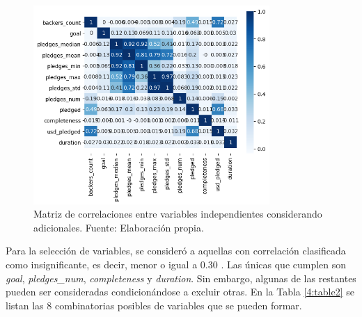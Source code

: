 \begin{figure}[!ht]
	\begin{center}
		\includegraphics[width=0.8\textwidth]{4/figures/metadata correlation v2.png}
		\caption{Matriz de correlaciones entre variables independientes considerando adicionales. Fuente: Elaboración propia.}
		\label{4:fig31}
	\end{center}
\end{figure}

Para la selección de variables, se consideró a aquellas con correlación clasificada como insignificante, es decir, menor o igual a 0.30 \parencite{tec_mukaka2012correlation}. Las únicas que cumplen son \textit{goal}, \textit{pledges\_num}, \textit{completeness} y \textit{duration}. Sin embargo, algunas de las restantes pueden ser consideradas condicionándose a excluir otras. En la Tabla \ref{4:table2} se listan las 8 combinatorias posibles de variables que se pueden formar.

